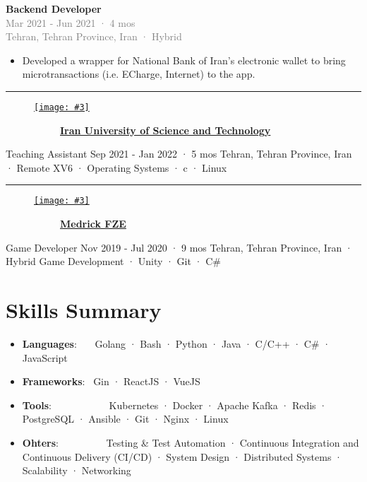 \documentclass[a4paper,20pt]{article}
\newcommand{\resumeItem}[2]{
  \item\small{
    \textbf{#1}{: #2 \vspace{-2pt}}
  }
}
\newcommand{\companyHeadingWithImageSimple}[3]{
    \vspace{-24pt}
    \begin{figure}[H]
        \href{#2}{\texttt{[image: \#3]}}
        \vspace{-37.5pt}
    \end{figure}
    ~~~~~~~~~~~\textbf{\href{#2}{#1}}
    \vspace{6pt}
}
\newcommand{\companyHeadingEnd}{
    \vspace{-22pt}
    \begin{center}
        \color{myGray}\par\noindent\rule{.92\textwidth}{0.1pt}
    \end{center}
}
\newcommand{\resumeSubItem}[2]{\resumeItem{#1}{#2}\vspace{-3pt}}
\newcommand{\resumeSubHeadingListStart}{\begin{itemize}[leftmargin=*, label={}]}
\newcommand{\resumeSubHeadingListEnd}{\end{itemize}}
\newcounter{mylist} %
\newenvironment{myitemize}{%
  \stepcounter{mylist}%
  \begin{itemize}
}{\end{itemize}%
  }
\newcommand{\newexperiencewithdesc}[5]{
    \begin{myitem}
        \textbf{#1} \\
        \textcolor{gray}{#2 \\#3\\}
        \vspace{4pt}
        #5
        \vspace{6pt}   
    \end{myitem}
}
\begin{document}
\begin{myitemize}
        \newexperiencewithdesc
            {Backend Developer}
            {Mar 2021 - Jun 2021 · 4 mos}
            {Tehran, Tehran Province, Iran · Hybrid}
            { Cloud Applications · Testing · Continuous Integration and Continuous Delivery (CI/CD) · Test Automation · Golang · Docker · DevOps · Backend · Go (Programming Language) · PostgreSQL · Redis · Kubernetes}
            {
                \begin{itemize}
                    \item Developed a wrapper for National Bank of Iran's electronic wallet to bring microtransactions (i.e. ECharge, Internet) to the app.
                \end{itemize}
            }
    \end{myitemize}
    \companyHeadingEnd
    \companyHeadingWithImageSimple{Iran University of Science and Technology}{https://www.linkedin.com/company/balemessenger}{iust}
    \vspace{2pt}
    \begin{myitemize}
        \begin{newexperience}                
            {Teaching Assistant}
            {Sep 2021 - Jan 2022 · 5 mos}
            {Tehran, Tehran Province, Iran · Remote}
            {XV6 · Operating Systems · c · Linux}
        \end{newexperience}
    \end{myitemize}
    \companyHeadingEnd
    \companyHeadingWithImageSimple{Medrick FZE}{https://www.linkedin.com/company/medrick-fze/}{medrick}
    \vspace{2pt}
    \begin{myitemize}
        \begin{newexperience}                
            {Game Developer}
            {Nov 2019 - Jul 2020 · 9 mos}
            {Tehran, Tehran Province, Iran · Hybrid}
            {Game Development · Unity · Git · C\#}
        \end{newexperience}
    \end{myitemize}
\vspace{-5pt}

\section{Skills Summary}
	\resumeSubHeadingListStart
	    \resumeSubItem{Languages}{~~~Golang · Bash · Python · Java · C/C++ · C\# · JavaScript}
	    \resumeSubItem{Frameworks}{~Gin · ReactJS · VueJS}
	    \resumeSubItem{Tools}{~~~~~~~~~~~Kubernetes · Docker · Apache Kafka · Redis · PostgreSQL · Ansible · Git · Nginx · Linux}
	    \resumeSubItem{Ohters}{~~~~~~~~~Testing \& Test Automation · Continuous Integration and Continuous Delivery (CI/CD) · System Design · Distributed Systems · Scalability · Networking}
    \resumeSubHeadingListEnd
\vspace{-5pt}
\end{document}
